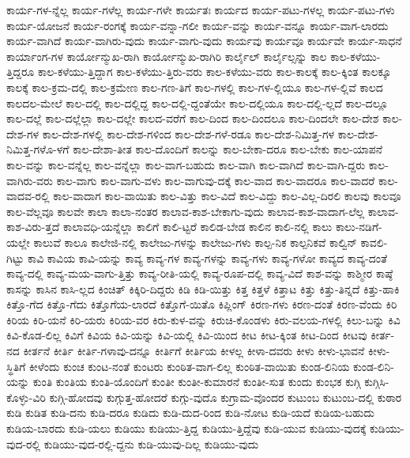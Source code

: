 {ಕಾರ್ಯ-ಗಳ-ನ್ನೆಲ್ಲ
ಕಾರ್ಯ-ಗಳೆಲ್ಲ
ಕಾರ್ಯ-ಗಳೇ
ಕಾರ್ಯತಃ
ಕಾರ್ಯದ
ಕಾರ್ಯ-ಪಟು-ಗಳಲ್ಲ
ಕಾರ್ಯ-ಪಟು-ಗಳು
ಕಾರ್ಯ-ಯೋಜನೆ
ಕಾರ್ಯ-ರಂಗಕ್ಕೆ
ಕಾರ್ಯ-ವನ್ನಾ-ಗಲೀ
ಕಾರ್ಯ-ವನ್ನು
ಕಾರ್ಯ-ವನ್ನೂ
ಕಾರ್ಯ-ವಾಗ-ಲಾರದು
ಕಾರ್ಯ-ವಾಗಿದೆ
ಕಾರ್ಯ-ವಾಗಿರು-ವುದು
ಕಾರ್ಯ-ವಾಗು-ವುದು
ಕಾರ್ಯವು
ಕಾರ್ಯವೂ
ಕಾರ್ಯವೇ
ಕಾರ್ಯ-ಸಾಧನೆ
ಕಾರ್ಯಾಂಗ-ಗಳ
ಕಾರ್ಯೋನ್ಮುಖ-ರಾಗಿ
ಕಾರ್ಯೋನ್ಮುಖ-ರಾಗಿರಿ
ಕಾರ್ಲೈಲ್
ಕಾರ್ಲೈಲ್ಸನ್ನು
ಕಾಲ
ಕಾಲ-ಕಳೆಯು-ತ್ತಿದ್ದರೂ
ಕಾಲ-ಕಳೆಯು-ತ್ತಿದ್ದಾಗ
ಕಾಲ-ಕಳೆಯು-ತ್ತಿರು-ವರು
ಕಾಲ-ಕಳೆಯು-ವರು
ಕಾಲ-ಕಾಲಕ್ಕೆ
ಕಾಲ-ಕ್ಕಿಂತ
ಕಾಲಕ್ಕೂ
ಕಾಲಕ್ಕೆ
ಕಾಲ-ಕ್ರಮ-ದಲ್ಲಿ
ಕಾಲ-ಕ್ರಮೇಣ
ಕಾಲ-ಗಣ-ತಿಗೆ
ಕಾಲ-ಗಳಲ್ಲಿ
ಕಾಲ-ಗಳ-ಲ್ಲಿಯೂ
ಕಾಲ-ಗಳ-ಲ್ಲಿವೆ
ಕಾಲದ
ಕಾಲದಲ-ಮೇಲೆ
ಕಾಲ-ದಲ್ಲಿ
ಕಾಲ-ದಲ್ಲಿದ್ದ
ಕಾಲ-ದಲ್ಲಿ-ದ್ದಂತೆಯೇ
ಕಾಲ-ದಲ್ಲಿಯೂ
ಕಾಲ-ದಲ್ಲಿ-ಲ್ಲದೆ
ಕಾಲ-ದಲ್ಲೂ
ಕಾಲ-ದಲ್ಲೆ
ಕಾಲ-ದಲ್ಲೆಲ್ಲಾ
ಕಾಲ-ದಲ್ಲೇ
ಕಾಲದ-ವರೆಗೆ
ಕಾಲ-ದಿಂದ
ಕಾಲ-ದಿಂದಲೂ
ಕಾಲ-ದಿಂದಲೇ
ಕಾಲ-ದೇಶ
ಕಾಲ-ದೇಶ-ಗಳ
ಕಾಲ-ದೇಶ-ಗಳಲ್ಲಿ
ಕಾಲ-ದೇಶ-ಗಳಿಂದ
ಕಾಲ-ದೇಶ-ಗಳೆ-ರಡೂ
ಕಾಲ-ದೇಶ-ನಿಮಿತ್ತ-ಗಳ
ಕಾಲ-ದೇಶ-ನಿಮಿತ್ತ-ಗಳೊ-ಳಗೆ
ಕಾಲ-ದೇಶಾ-ತೀತ
ಕಾಲ-ದೊಂದಿಗೆ
ಕಾಲನ್ನು
ಕಾಲ-ಬೇಕಾ-ದರೂ
ಕಾಲ-ಬೇಕು
ಕಾಲ-ಯಾಪನೆ
ಕಾಲ-ವನ್ನು
ಕಾಲ-ವನ್ನೆಲ್ಲ
ಕಾಲ-ವನ್ನೆಲ್ಲಾ
ಕಾಲ-ವಾಗ-ಬಹುದು
ಕಾಲ-ವಾಗಿ
ಕಾಲ-ವಾಗಿದೆ
ಕಾಲ-ವಾಗಿ-ದ್ದರು
ಕಾಲ-ವಾಗಿರು-ವರು
ಕಾಲ-ವಾಗು
ಕಾಲ-ವಾಗು-ವಳು
ಕಾಲ-ವಾಗುವು-ದಕ್ಕೆ
ಕಾಲ-ವಾದ
ಕಾಲ-ವಾದರೂ
ಕಾಲ-ವಾದರೆ
ಕಾಲ-ವಾದವ-ರಲ್ಲಿ
ಕಾಲ-ವಾದಾಗ
ಕಾಲ-ವಾಯಿತು
ಕಾಲ-ವಿತ್ತು
ಕಾಲ-ವಿದೆ
ಕಾಲ-ವಿದ್ದು
ಕಾಲ-ವಿಲ್ಲ-ದಿರಲಿ
ಕಾಲವು
ಕಾಲವೂ
ಕಾಲ-ವೆಲ್ಲವೂ
ಕಾಲವೇ
ಕಾಲಾ
ಕಾಲಾ-ನಂತರ
ಕಾಲಾವ-ಕಾಶ-ಬೇಕಾಗು-ವುದು
ಕಾಲಾವ-ಕಾಶ-ವಾದಾಗ-ಲೆಲ್ಲ
ಕಾಲಾವ-ಕಾಶ-ವಿರು-ತ್ತದೆ
ಕಾಲಾವಧಿ-ಯನ್ನೆಲ್ಲಾ
ಕಾಲಿಗೆ
ಕಾಲಿ-ಟ್ಟರೆ
ಕಾಲಿಡ-ಬೇಡ
ಕಾಲಿನ
ಕಾಲಿ-ನಲ್ಲಿ
ಕಾಲು
ಕಾಲು-ನಡಿಗೆ-ಯಲ್ಲೇ
ಕಾಲುವೆ
ಕಾಲೂ
ಕಾಲೇಜಿ-ನಲ್ಲಿ
ಕಾಲೇಜು-ಗಳನ್ನು
ಕಾಲೇಜು-ಗಳು
ಕಾಲ್ಪ-ನಿಕ
ಕಾಲ್ಪನಿಕವೆ
ಕಾಲ್ವಿನ್
ಕಾವಲಿ-ಗಿಟ್ಟು
ಕಾವಿ
ಕಾವಿಯ
ಕಾವಿ-ಯನ್ನು
ಕಾವ್ಯ
ಕಾವ್ಯ-ಗಳ
ಕಾವ್ಯ-ಗಳನ್ನು
ಕಾವ್ಯ-ಗಳು
ಕಾವ್ಯ-ಗಳೋ
ಕಾವ್ಯದ
ಕಾವ್ಯ-ದಂತೆ
ಕಾವ್ಯ-ದಲ್ಲಿ
ಕಾವ್ಯ-ಮಯ-ವಾಗು-ತ್ತಿತ್ತು
ಕಾವ್ಯ-ರೀತಿ-ಯಲ್ಲಿ
ಕಾವ್ಯ-ರೂಪ-ದಲ್ಲಿ
ಕಾವ್ಯ-ವಿದೆ
ಕಾಶ-ವನ್ನು
ಕಾಶ್ಮೀರ
ಕಾಷ್ಠೆ
ಕಾಸನ್ನು
ಕಾಸಿನ
ಕಾಸಿ-ಲ್ಲದ
ಕಿಂಚಿತ್
ಕಿಕ್ಕಿರಿ-ದಿದ್ದರು
ಕಿಡಿ
ಕಿಡಿ-ಯಿತ್ತು
ಕಿತ್ತ
ಕಿತ್ತಳೆ
ಕಿತ್ತಾಟ
ಕಿತ್ತು
ಕಿತ್ತು-ತಿನ್ನದೆ
ಕಿತ್ತು-ಹಾಕಿ
ಕಿತ್ತೊ-ಗೆದ
ಕಿತ್ತೊ-ಗೆದು
ಕಿತ್ತೊಗೆಯ-ಲಾರದೆ
ಕಿತ್ತೊಗೆ-ಯಿತೊ
ಕಿಪ್ಲಿಂಗ್
ಕಿರಣ-ಗಳು
ಕಿರಣ-ದಂತೆ
ಕಿರಣ-ವೆಂದು
ಕಿರಿ
ಕಿರಿಯ
ಕಿರಿ-ಯನೆ
ಕಿರಿ-ಯರು
ಕಿರಿಯ-ವರ
ಕಿರು-ಕುಳ-ವನ್ನು
ಕಿರುಚಿ-ಕೊಂಡಳು
ಕಿರು-ವಲಯ-ಗಳಲ್ಲಿ
ಕಿಲು-ಬನ್ನು
ಕಿವಿ
ಕಿವಿ-ಕೊಡ-ಲಿಲ್ಲ
ಕಿವಿಗೆ
ಕಿವಿಯ
ಕಿವಿ-ಯನ್ನು
ಕಿವಿ-ಯಲ್ಲಿ
ಕಿವಿ-ಯಿಂದ
ಕೀಟ
ಕೀಟ-ಕ್ಕಿಂತ
ಕೀಟ-ದಿಂದ
ಕೀಟವು
ಕೀರ್ತ-ನದ
ಕೀರ್ತನೆ
ಕೀರ್ತಿ
ಕೀರ್ತಿ-ಗಳಾವು-ದನ್ನೂ
ಕೀರ್ತಿಗೆ
ಕೀರ್ತಿಯ
ಕೀಳಲ್ಲ
ಕೀಳಾ-ದವರು
ಕೀಳು
ಕೀಳು-ಭಾವನೆ
ಕೀಳು-ಸ್ಥಿತಿಗೆ
ಕೀಳೆಂದು
ಕುಂಚ
ಕುಂಟ-ನಂತೆ
ಕುಂಟರು
ಕುಂಠಿತ-ವಾಗ-ಲಿಲ್ಲ
ಕುಂಠಿತ-ವಾಯಿತು
ಕುಂಡ-ಲಿನಿಯ
ಕುಂಡ-ಲಿನಿ-ಯನ್ನು
ಕುಂತಿ
ಕುಂತಿಯ
ಕುಂತಿ-ಯೊಂದಿಗೆ
ಕುಂತೀ
ಕುಂತೀ-ಕುಮಾರನೆ
ಕುಂತೀ-ಸುತ
ಕುಂದು
ಕುಂಭಕ
ಕುಗ್ಗಿ
ಕುಗ್ಗಿಸಿ-ಕೊಳ್ಳು-ವಿರಿ
ಕುಗ್ಗಿ-ಹೋದವು
ಕುಗ್ಗುತ್ತ-ಹೋದರೆ
ಕುಗ್ಗು-ವುದೊ
ಕುಗ್ರಾಮ-ವೊಂದರ
ಕುಟುಂಬ
ಕುಟುಂಬ-ದಲ್ಲಿ
ಕುಠಾರ
ಕುಡಿ
ಕುಡಿತ
ಕುಡಿ-ದನು
ಕುಡಿ-ದರೂ
ಕುಡಿದು
ಕುಡಿ-ದುದ-ರಿಂದ
ಕುಡಿ-ನೋಟ
ಕುಡಿ-ಯದೆ
ಕುಡಿಯ-ಬಹುದು
ಕುಡಿಯ-ಬಾರದು
ಕುಡಿ-ಯಲು
ಕುಡಿಯು
ಕುಡಿಯು-ತ್ತಿದ್ದ
ಕುಡಿಯು-ತ್ತಿದ್ದೆವು
ಕುಡಿ-ಯುವ
ಕುಡಿಯು-ವುದಕ್ಕೆ
ಕುಡಿಯು-ವುದ-ರಲ್ಲಿ
ಕುಡಿಯು-ವುದ-ರಲ್ಲಿ-ದ್ದನು
ಕುಡಿ-ಯುವು-ದಿಲ್ಲ
ಕುಡಿಯು-ವುದು
}
